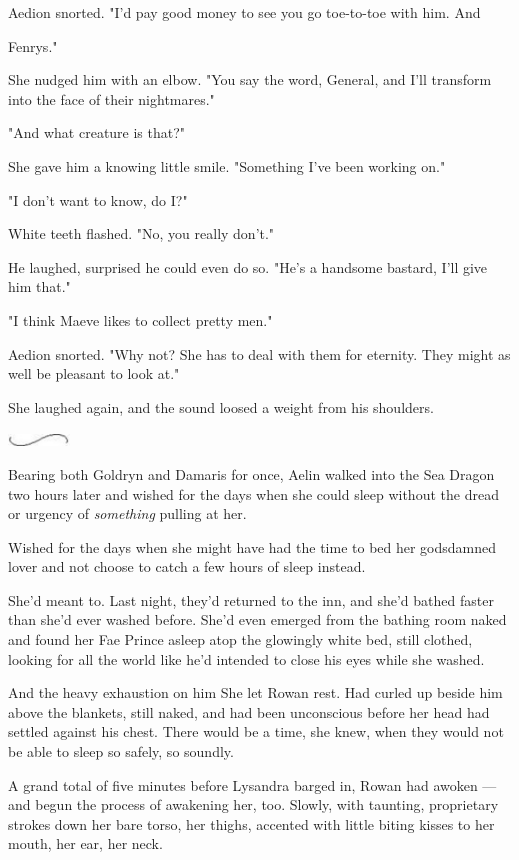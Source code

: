 Aedion snorted. "I'd pay good money to see you go toe-to-toe with him. And

Fenrys."

She nudged him with an elbow. "You say the word, General, and I'll transform into the face of their nightmares."

"And what creature is that?"

She gave him a knowing little smile. "Something I've been working on."

"I don't want to know, do I?"

White teeth flashed. "No, you really don't."

He laughed, surprised he could even do so. "He's a handsome bastard, I'll give him that."

"I think Maeve likes to collect pretty men."

Aedion snorted. "Why not? She has to deal with them for eternity. They might as well be pleasant to look at."

She laughed again, and the sound loosed a weight from his shoulders.

\includegraphics[width=0.65in,height=0.13in]{images/seperator}

Bearing both Goldryn and Damaris for once, Aelin walked into the Sea Dragon two hours later and wished for the days when she could sleep without the dread or urgency of \emph{something} pulling at her.

Wished for the days when she might have had the time to bed her godsdamned lover and not choose to catch a few hours of sleep instead.

She'd meant to. Last night, they'd returned to the inn, and she'd bathed faster than she'd ever washed before. She'd even emerged from the bathing room naked  and found her Fae Prince asleep atop the glowingly white bed, still clothed, looking for all the world like he'd intended to close his eyes while she washed.

And the heavy exhaustion on him  She let Rowan rest. Had curled up beside him above the blankets, still naked, and had been unconscious before her head had settled against his chest. There would be a time, she knew, when they would not be able to sleep so safely, so soundly.

A grand total of five minutes before Lysandra barged in, Rowan had awoken ---and begun the process of awakening her, too. Slowly, with taunting, proprietary strokes down her bare torso, her thighs, accented with little biting kisses to her mouth, her ear, her neck.

